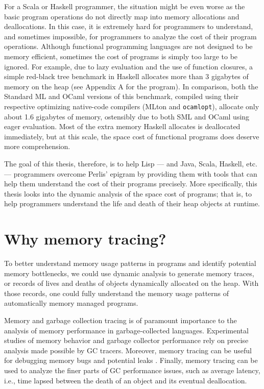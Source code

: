 For a Scala or Haskell programmer, the situation might be even worse as the basic program operations do not directly map into
memory allocations and deallocations. In this case, it is extremely hard for programmers to understand, and sometimes impossible,
for programmers to analyze the cost of their program operations. Although functional programming languages are not designed to be
memory efficient, sometimes the cost of programs is simply too large to be ignored. For example, due to lazy evaluation and
the use of function closures, a simple red-black tree benchmark in Haskell allocates more than 3 gigabytes of memory on the heap
(see Appendix A for the program). In comparison, both the Standard ML and OCaml versions of this benchmark, compiled using their
respective optimizing native-code compilers (MLton and \lstinline{ocamlopt}), allocate only about 1.6 gigabytes of memory, ostensibly due to
both SML and OCaml using eager evaluation. Most of the extra memory Haskell allocates is deallocated immediately, but at this scale,
the space cost of functional programs does deserve more comprehension.  

The goal of this thesis, therefore, is to help Lisp --- and Java, Scala, Haskell, etc. --- programmers overcome Perlis' epigram
by providing them with tools that can help them understand the cost of their programs precisely. More specifically, this thesis looks into the
dynamic analysis of the space cost of programs; that is, to help programmers understand the life and death of their heap objects
at runtime.

\section{Why memory tracing?}
To better understand memory usage patterns in programs and identify
potential memory bottlenecks, we could use dynamic analysis to generate memory traces, or records of lives and
deaths of objects dynamically allocated on the heap. With those records, one could fully understand the memory usage
patterns of automatically memory managed programs.

Memory and garbage collection tracing is of paramount importance to the analysis of memory performance in garbage-collected
languages. Experimental studies of memory behavior and garbage collector performance \citep{ScalaJava, Garbology} rely on
precise analysis made possible by GC tracers. Moreover, memory tracing can be useful for debugging memory bugs and potential leaks
\citep{MemInsight}. Finally, memory tracing can be used to analyze the finer parts of GC performance issues, such as average
latency, i.e., time lapsed between the death of an object and its eventual deallocation.


